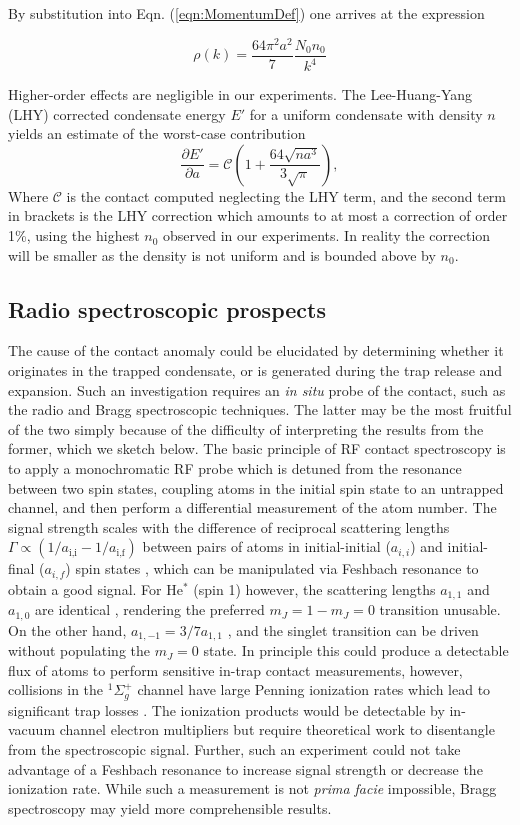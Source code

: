 By substitution into Eqn. (\ref{eqn:MomentumDef}) one arrives at the expression

\begin{equation}
\rho(k) = \frac{64\pi^2a^2}{7} \frac{N_0n_0}{k^4}
\end{equation}

Higher-order effects are negligible in our experiments. The Lee-Huang-Yang (LHY) corrected condensate energy $E'$ for a uniform condensate with density $n$ yields an estimate of the worst-case contribution
$$
\frac{\partial E'}{\partial a} = \mathcal{C}\left(1+\frac{64\sqrt{na^{3}}}{3\sqrt{\pi}}\right),
$$
Where $\mathcal{C}$ is the contact computed neglecting the LHY term, and the second term in brackets is the LHY correction which amounts to at most a correction of order 1\%, using the highest $n_0$ observed in our experiments. In reality the correction will be smaller as the density is not uniform and is bounded above by $n_0$.


\subsection{Radio spectroscopic prospects}
The cause of the contact anomaly could be elucidated by determining whether it originates in the trapped condensate, or is generated during the trap release and expansion. Such an investigation requires an \emph{in situ} probe of the contact, such as the radio and Bragg spectroscopic techniques. The latter may be the most fruitful of the two simply because of the difficulty of interpreting the results from the former, which we sketch below. The basic principle of RF contact spectroscopy is to apply a monochromatic RF probe which is detuned from the resonance between two spin states, coupling atoms in the initial spin state to an untrapped channel, and then perform a differential measurement of the atom number. The signal strength scales with the difference of reciprocal scattering lengths $\Gamma\propto(1/a_\textrm{i,i}-1/a_\textrm{i,f})$ between pairs of atoms in initial-initial ($a_{i,i}$) and initial-final ($a_{i,f}$) spin states \cite{braaten10,wild12}, which can be manipulated via Feshbach resonance to obtain a good signal. For He$^*$ (spin 1) however, the scattering lengths $a_{1,1}$ and $a_{1,0}$ are identical \cite{Leo01}, rendering the preferred $m_J=1-m_J=0$ transition unusable. On the other hand, $a_{1,-1} = 3/7 a_{1,1}$ \cite{vassen16}, and the singlet transition can be driven without populating the $m_J=0$ state. In principle this could produce a detectable flux of atoms to perform sensitive in-trap contact measurements, however, collisions in the $^1\Sigma_{g}^{+}$ channel have large Penning ionization rates which lead to significant trap losses \cite{Leo01}. The ionization products would be detectable by in-vacuum channel electron multipliers but require theoretical work to disentangle from the spectroscopic signal. Further, such an experiment could not take advantage of a Feshbach resonance to increase signal strength or decrease the ionization rate. While such a measurement is not \emph{prima facie} impossible, Bragg spectroscopy may yield more comprehensible results.

